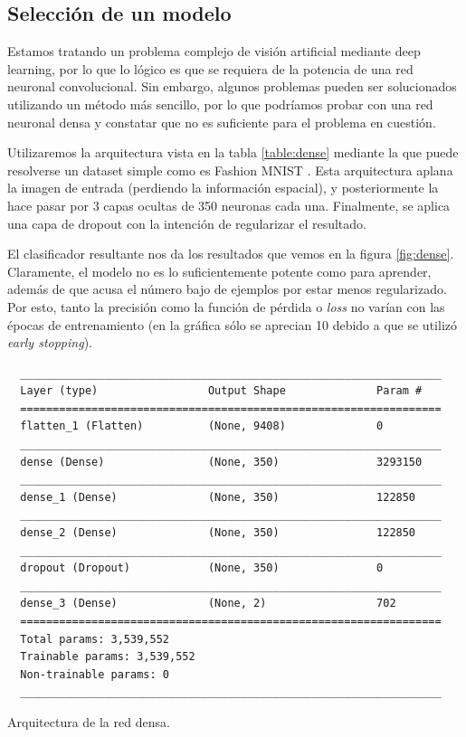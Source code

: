 \subsection{Selección de un modelo}

Estamos tratando un problema complejo de visión artificial mediante deep learning, por lo que lo lógico es que se requiera de la potencia de una red neuronal convolucional. Sin embargo, algunos problemas pueden ser solucionados utilizando un método más sencillo, por lo que podríamos probar con una red neuronal densa y constatar que no es suficiente para el problema en cuestión.

Utilizaremos la arquitectura vista en la tabla \ref{table:dense} mediante la que puede resolverse un dataset simple como es Fashion MNIST \cite{art:xiao2017fashionmnist}. Esta arquitectura aplana la imagen de entrada (perdiendo la información espacial), y posteriormente la hace pasar por 3 capas ocultas de 350 neuronas cada una. Finalmente, se aplica una capa de dropout con la intención de regularizar el resultado.


El clasificador resultante nos da los resultados que vemos en la figura \ref{fig:dense}. Claramente, el modelo no es lo suficientemente potente como para aprender, además de que acusa el número bajo de ejemplos por estar menos regularizado. Por esto, tanto la precisión como la función de pérdida o \textit{loss} no varían con las épocas de entrenamiento (en la gráfica sólo se aprecian 10 debido a que se utilizó \textit{early stopping}).

\begin{table}
  \begin{lstlisting} 
  _________________________________________________________________
  Layer (type)                 Output Shape              Param #   
  =================================================================
  flatten_1 (Flatten)          (None, 9408)              0         
  _________________________________________________________________
  dense (Dense)                (None, 350)               3293150   
  _________________________________________________________________
  dense_1 (Dense)              (None, 350)               122850    
  _________________________________________________________________
  dense_2 (Dense)              (None, 350)               122850    
  _________________________________________________________________
  dropout (Dropout)            (None, 350)               0         
  _________________________________________________________________
  dense_3 (Dense)              (None, 2)                 702       
  =================================================================
  Total params: 3,539,552
  Trainable params: 3,539,552
  Non-trainable params: 0
  _________________________________________________________________
  \end{lstlisting}
  \caption{Arquitectura de la red densa.}
  \label{table:dense}
\end{table}

